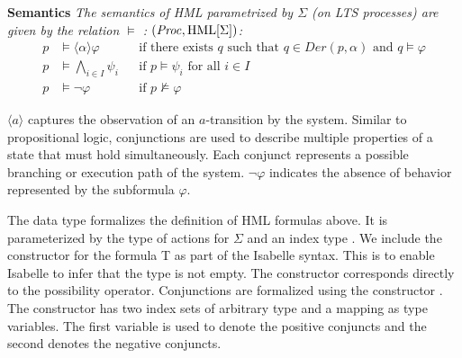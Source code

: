 \begin{isabellebody}
\begin{isamarkuptext}
\textbf{Semantics} \textit{The \textnormal{semantics of HML} parametrized by $\Sigma$ (on LTS processes) are given by the relation $\models$ : $(\mathit{Proc}, \text{HML}[\Sigma])$:
\begin{align*}
  p &\models \langle \alpha \rangle\varphi && \text{if there exists } q \text{ such that } q\in\mathit{Der}(p, \alpha) \text{ and } q \models\varphi \\
  p &\models \bigwedge_{i \in I} \psi_i && \text{if } p\models\psi_i \text{ for all } i\in I \\
  p &\models \lnot\varphi && \text{if } p\not\models\varphi
\end{align*}}%
\end{isamarkuptext}\isamarkuptrue%
%
\begin{isamarkuptext}%
$\langle a \rangle$ captures the observation of an $a$-transition by the system. 
Similar to propositional logic, conjunctions are used to describe multiple properties of a state that must hold simultaneously. Each conjunct represents a possible branching or execution path of the system. $\lnot\varphi$ indicates the absence of behavior represented by the subformula $\varphi$.%
\end{isamarkuptext}\isamarkuptrue%
%
\begin{isamarkuptext}%
The data type  formalizes the definition of HML formulas above. It is parameterized by the type of actions  for $\Sigma$
and an index type . We include the constructor  for the formula \textsf{T} as part of the Isabelle syntax. This is to enable Isabelle to infer that the type  is not empty. The constructor  corresponds directly to the possibility operator. 
Conjunctions are formalized using the constructor . The constructor has two index sets of arbitrary type  and a mapping  as type variables. The first variable is used to denote the positive conjuncts and the second denotes the negative conjuncts. 

\end{isamarkuptext}
\end{isabellebody}
